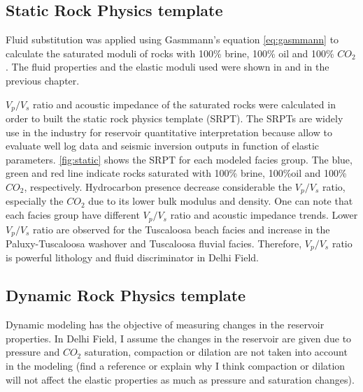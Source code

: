 \clearpage
\newpage
\subsection{Static Rock Physics template}

Fluid substitution was applied using Gasmmann's equation \ref{eq:gasmmann} to calculate
the saturated moduli of rocks with 100\% brine, 100\% oil and 100\% $CO_{2}$. The fluid properties
and the elastic moduli used were shown in \label{tab:fluid} and \label{tab:flag} in the previous chapter.

$V_{p}/V_{s}$ ratio and acoustic impedance of the saturated rocks were calculated in 
order to built the static rock physics template (SRPT). 
The SRPTs are widely use in the industry for reservoir quantitative interpretation 
because allow to evaluate well log data and seismic inversion outputs in function
of elastic parameters. \ref{fig:static} shows the SRPT for each modeled facies group. The blue, 
green and red line indicate rocks saturated with 100\% brine, 100\%oil and 100\%$CO_{2}$, respectively. 
Hydrocarbon presence decrease considerable the $V_{p}/V_{s}$ ratio, especially the $CO_{2}$ due to its lower bulk
modulus and density.  
One can note that each
facies group have different $V_{p}/V_{s}$ ratio and acoustic impedance trends. Lower $V_{p}/V_{s}$ ratio
are observed for the Tuscaloosa beach facies and increase in the Paluxy-Tuscaloosa washover and Tuscaloosa
fluvial facies. Therefore, $V_{p}/V_{s}$ ratio is powerful lithology and fluid discriminator in Delhi Field. 


\subsection{Dynamic Rock Physics template}

Dynamic modeling has the objective of measuring changes in the reservoir
properties. In Delhi Field, I assume the changes in the reservoir are given due
to pressure and $CO_{2}$ saturation, compaction or dilation are not taken into account
in the modeling (find a reference or explain why I think compaction or dilation
will not affect the elastic properties as much as pressure and saturation changes). 

